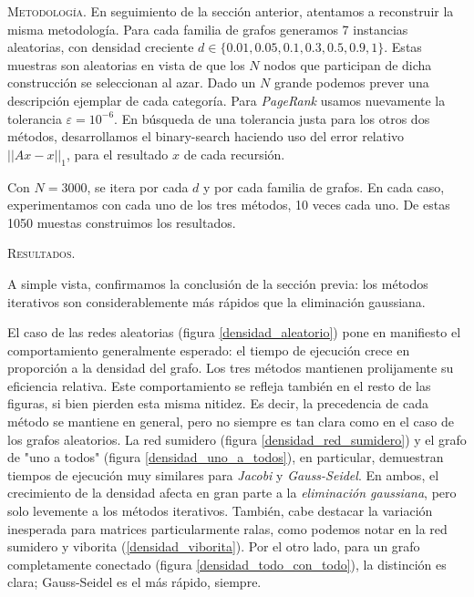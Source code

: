 \noindent\textsc{Metodología}.
En seguimiento de la sección anterior, atentamos a reconstruir la misma metodología.
Para cada familia de grafos generamos 7 instancias aleatorias, con densidad creciente $d \in \{0.01, 0.05, 0.1, 0.3, 0.5, 0.9, 1\}$.
Estas muestras son aleatorias en vista de que los $N$ nodos que participan de dicha construcción se seleccionan al azar.
Dado un $N$ grande podemos prever una descripción ejemplar de cada categoría. %
Para \textit{PageRank} usamos nuevamente la tolerancia $\varepsilon = 10^{-6}$.
En búsqueda de una tolerancia justa para los otros dos métodos, desarrollamos el binary-search haciendo uso del error relativo $||Ax - x||_1$,
para el resultado $x$ de cada recursión. 

Con $N = 3000$, se itera por cada $d$ y por cada familia de grafos. En cada caso, experimentamos con cada uno de los tres métodos, 10 veces cada uno.
De estas 1050 muestas construimos los resultados. 

\vspace{2em}
\noindent\textsc{Resultados}.

A simple vista, confirmamos la conclusión de la sección previa: los métodos iterativos son considerablemente más rápidos que la eliminación gaussiana.

El caso de las redes aleatorias (figura \ref{densidad_aleatorio}) pone en manifiesto el comportamiento generalmente esperado: 
el tiempo de ejecución crece en proporción a la densidad del grafo.
Los tres métodos mantienen prolijamente su eficiencia relativa.
Este comportamiento se refleja también en el resto de las figuras, si bien pierden esta misma nitidez.
Es decir, la precedencia de cada método se mantiene en general, pero no siempre es tan clara como en el caso de los grafos aleatorios.
La red sumidero (figura \ref{densidad_red_sumidero}) y el grafo de "uno a todos" (figura \ref{densidad_uno_a_todos}), en particular,
demuestran tiempos de ejecución muy similares para \emph{Jacobi} y \emph{Gauss-Seidel}.
En ambos, el crecimiento de la densidad afecta en gran parte a la \emph{eliminación gaussiana}, pero solo levemente a los métodos iterativos.
También, cabe destacar la variación inesperada para matrices particularmente ralas, como podemos notar en la red sumidero y viborita (\ref{densidad_viborita}).
Por el otro lado, para un grafo completamente conectado (figura \ref{densidad_todo_con_todo}), la distinción es clara; Gauss-Seidel es el más rápido, siempre.

